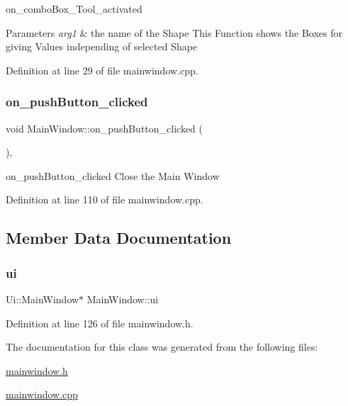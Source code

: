 on\+\_\+combo\+Box\+\_\+\+Tool\+\_\+activated 


\begin{DoxyParams}{Parameters}
{\em arg1} & the name of the Shape This Function shows the Boxes for giving Values independing of selected Shape \\
\hline
\end{DoxyParams}


Definition at line 29 of file mainwindow.\+cpp.

\mbox{\label{class_main_window_a4de79c63c7fa0b8d7c468ac71f20be81}} 
\subsubsection{\texorpdfstring{on\+\_\+push\+Button\+\_\+clicked}{on\_pushButton\_clicked}}
{\footnotesize\ttfamily void Main\+Window\+::on\+\_\+push\+Button\+\_\+clicked (\begin{DoxyParamCaption}{ }\end{DoxyParamCaption})\hspace{0.3cm}{\ttfamily [private]}, {\ttfamily [slot]}}



on\+\_\+push\+Button\+\_\+clicked Close the Main Window 



Definition at line 110 of file mainwindow.\+cpp.



\subsection{Member Data Documentation}
\mbox{\label{class_main_window_a35466a70ed47252a0191168126a352a5}} 
\subsubsection{\texorpdfstring{ui}{ui}}
{\footnotesize\ttfamily Ui\+::\+Main\+Window$\ast$ Main\+Window\+::ui\hspace{0.3cm}{\ttfamily [private]}}



Definition at line 126 of file mainwindow.\+h.



The documentation for this class was generated from the following files\+:\begin{DoxyCompactItemize}
\item 
\mbox{\hyperlink{mainwindow_8h}{mainwindow.\+h}}\item 
\mbox{\hyperlink{mainwindow_8cpp}{mainwindow.\+cpp}}\end{DoxyCompactItemize}
